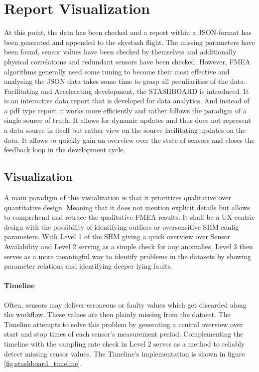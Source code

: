 \newpage


\section{Report Visualization}

At this point, the data has been checked and a report within a JSON-format has been generated and appended to the skystash flight. The missing parameters have been found, sensor values have been checked by themselves and additionally physical correlations and redundant sensors have been checked. However, FMEA algorithms generally need some tuning to become their most effective and analysing the JSON data takes some time to grasp all peculiarities of the data. Facilitating and Accelerating development, the STASHBOARD is introduced. It is an interactive data report that is developed for data analytics. And instead of a pdf type report it works more efficiently and rather follows the paradigm of a single source of truth. It allows for dynamic updates and thus does not represent a data source in itself but rather view on the source facilitating updates on the data. It allows to quickly gain an overview over the state of sensors and closes the feedback loop in the development cycle.

\subsection{Visualization}
A main paradigm of this visualization is that it prioritizes qualitative over quantitative design. Meaning that it does not mention explicit details but allows to comprehend and retrace the qualitative FMEA results. It shall be a UX-centric design with the possibility of identifying outliers or oversensitive SHM config parameters. With Level 1 of the SHM giving a quick overview over Sensor Availability and Level 2 serving as a simple check for any anomalies. Level 3 then serves as a more meaningful way to identify problems in the datasets by showing parameter relations and identifying deeper lying faults.

\paragraph{Timeline}

Often, sensors may deliver erroneous or faulty values which get discarded along the workflow. These values are then plainly missing from the dataset. The Timeline attempts to solve this problem by generating a central overview over start and stop times of each sensor's measurement period. Complementing the timeline with the sampling rate check in Level 2 serves as a method to reliably detect missing sensor values. The Timeline's implementation is shown in figure \ref{fig:stashboard_timeline}.

